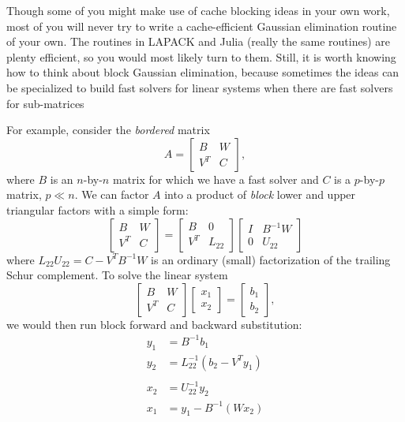 \documentclass[12pt, leqno]{article}
\begin{document}
Though some of you might make use of cache blocking ideas in your own
work, most of you will never try to write a cache-efficient Gaussian
elimination routine of your own.  The routines in LAPACK and Julia
(really the same routines) are plenty efficient, so you would most
likely turn to them.  Still, it is worth knowing how to think about
block Gaussian elimination, because sometimes the ideas can be specialized
to build fast solvers for linear systems when there are fast solvers for
sub-matrices

For example, consider the {\em bordered} matrix
\[
  A = \begin{bmatrix} B & W \\ V^T & C \end{bmatrix},
\]
where $B$ is an $n$-by-$n$ matrix for which we have a fast
solver and $C$ is a $p$-by-$p$ matrix, $p \ll n$.
We can factor $A$ into a product of {\em block} lower and
upper triangular factors with a simple form:
\[
  \begin{bmatrix} B & W \\ V^T & C \end{bmatrix} =
  \begin{bmatrix} B   & 0 \\ V^T & L_{22} \end{bmatrix}
  \begin{bmatrix} I & B^{-1} W \\ 0 & U_{22} \end{bmatrix}
\]
where $L_{22} U_{22} = C-V^T B^{-1} W$ is an ordinary (small) factorization
of the trailing Schur complement.  To solve the linear system
\[
  \begin{bmatrix} B & W \\ V^T & C \end{bmatrix}
  \begin{bmatrix} x_1 \\ x_2 \end{bmatrix} =
  \begin{bmatrix} b_1 \\ b_2 \end{bmatrix},
\]
we would then run block forward and backward substitution:
\begin{align*}
  y_1 &= B^{-1} b_1 \\
  y_2 &= L_{22}^{-1} \left( b_2 - V^T y_1 \right) \\
\\
  x_2 &= U_{22}^{-1} y_2 \\
  x_1 &= y_1-B^{-1} (W x_2)
\end{align*}
\end{document}
